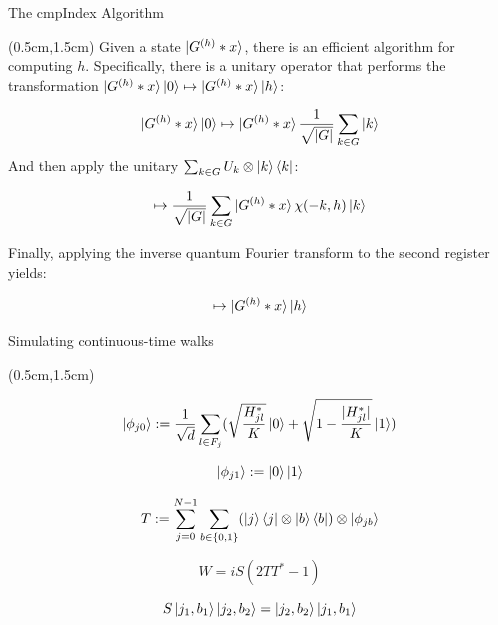 \documentclass{beamer}
\theoremstyle{definition}
\begin{document}
\begin{frame}{The cmpIndex Algorithm}
    
    \begin{textblock*}{12cm}(0.5cm,1.5cm)
        Given a state $\ket{G^{(h)} * x}$, there is an efficient algorithm for computing $h$.
        Specifically, there is a unitary operator that performs the transformation $\ket{G^{(h)} * x} \ket{0} \mapsto \ket{G^{(h)} * x} \ket{h}$:

        \[
        \ket{G^{(h)} * x}\ket{0} \mapsto \ket{G^{(h)} * x} \frac{1}{\sqrt{|G|}}\sum_{k \in G}\ket{k}
        \]
        And then apply the unitary $\sum_{k \in G}U_k \otimes \ket{k}\bra{k}$:

        \[
        \mapsto \frac{1}{\sqrt{|G|}}\sum_{k \in G}\ket{G^{(h)}*x}\chi(-k,h)\ket{k}
        \]

       
        Finally, applying the inverse quantum Fourier transform to the second register yields:
       

        \[
           \mapsto  \ket{G^{(h)}*x}\ket{h}
        \]
    \end{textblock*}

\end{frame}





\begin{frame}{Simulating continuous-time walks}
    
    \begin{textblock*}{12cm}(0.5cm,1.5cm)
      
        \[
        \ket{\phi_{j0}} := \frac{1}{\sqrt{d}}\sum_{l \in F_j}(\sqrt{\frac{H^*_{jl}}{K}}\ket{0} + \sqrt{1-\frac{|H^*_{jl}|}{K}}\ket{1})
        \]

        \[
        \ket{\phi_{j1}} := \ket{0}\ket{1}
        \]

        \[
        T := \sum_{j=0}^{N-1}\sum_{b \in {\{0,1\}}}(\ket{j}\bra{j}\otimes\ket{b}\bra{b})\otimes\ket{\phi_{jb}}
        \]

        \[
        W = iS(2TT^* - 1)
        \]

        \[
        S\ket{j_1,b_1}\ket{j_2,b_2} = \ket{j_2,b_2}\ket{j_1,b_1}
        \]



    \end{textblock*}

\end{frame}
\end{document}
